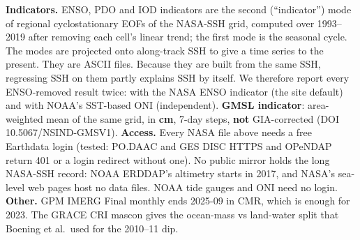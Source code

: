 \documentclass[10pt]{article}
\begin{document}
\begin{cabox}
\textbf{Indicators.} ENSO, PDO and IOD indicators are the second (``indicator'') mode of regional cyclostationary EOFs of the NASA-SSH grid,
computed over 1993--2019 after removing each cell's linear trend; the first mode is the seasonal cycle. The modes are projected onto
along-track SSH to give a time series to the present. They are ASCII files. Because they are built from the same SSH, regressing SSH on them
partly explains SSH by itself. We therefore report every ENSO-removed result twice: with the NASA ENSO indicator (the site default) and with
NOAA's SST-based ONI (independent). \textbf{GMSL indicator}: area-weighted mean of the same grid, in \textbf{cm}, 7-day steps, \textbf{not}
GIA-corrected (DOI 10.5067/NSIND-GMSV1).
\textbf{Access.} Every NASA file above needs a free Earthdata login (tested: PO.DAAC and GES DISC HTTPS and OPeNDAP return 401 or a login
redirect without one). No public mirror holds the long NASA-SSH record: NOAA ERDDAP's altimetry starts in 2017, and NASA's sea-level web pages
host no data files. NOAA tide gauges and ONI need no login.
\textbf{Other.} GPM IMERG Final monthly ends 2025-09 in CMR, which is enough for 2023. The GRACE CRI mascon gives the ocean-mass vs
land-water split that Boening et al.\ used for the 2010--11 dip.
\end{cabox}
\end{document}
